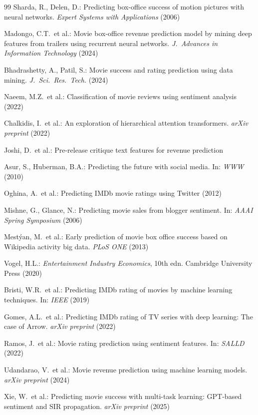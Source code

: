 \documentclass[runningheads]{llncs}
\begin{document}
\begin{thebibliography}{99}
Sharda, R., Delen, D.: Predicting box-office success of motion
pictures with neural networks. \emph{Expert Systems with
Applications} (2006)

Madongo, C.T.\ et al.: Movie box-office revenue prediction model
by mining deep features from trailers using recurrent neural
networks. \emph{J.\ Advances in Information Technology} (2024)

Bhadrashetty, A., Patil, S.: Movie success and rating prediction
using data mining. \emph{J.\ Sci.\ Res.\ Tech.} (2024)

Naeem, M.Z.\ et al.: Classification of movie reviews using
sentiment analysis (2022)

Chalkidis, I.\ et al.: An exploration of hierarchical attention
transformers. \emph{arXiv preprint} (2022)

Joshi, D.\ et al.: Pre-release critique text features for revenue
prediction

Asur, S., Huberman, B.A.: Predicting the future with social media.
In: \emph{WWW} (2010)

Oghina, A.\ et al.: Predicting IMDb movie ratings using Twitter
(2012)

Mishne, G., Glance, N.: Predicting movie sales from blogger
sentiment. In: \emph{AAAI Spring Symposium} (2006)

Mest{\'y}an, M.\ et al.: Early prediction of movie box office
success based on Wikipedia activity big data. \emph{PLoS ONE}
(2013)

Vogel, H.L.: \emph{Entertainment Industry Economics}, 10th edn.
Cambridge University Press (2020)

Bristi, W.R.\ et al.: Predicting IMDb rating of movies by machine
learning techniques. In: \emph{IEEE} (2019)

Gomes, A.L.\ et al.: Predicting IMDb rating of TV series with
deep learning: The case of Arrow. \emph{arXiv preprint} (2022)

Ramos, J.\ et al.: Movie rating prediction using sentiment
features. In: \emph{SALLD} (2022)

Udandarao, V.\ et al.: Movie revenue prediction using machine
learning models. \emph{arXiv preprint} (2024)

Xie, W.\ et al.: Predicting movie success with multi-task
learning: GPT-based sentiment and SIR propagation.
\emph{arXiv preprint} (2025)


\end{thebibliography}
\end{document}
